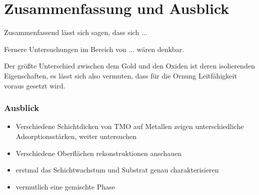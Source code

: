 \chapter{Zusammenfassung und Ausblick}
    Zusammenfassend lässt sich sagen, dass sich  ...

    Fernere Untersuchungen im Bereich von ... wären denkbar.

    Der größte Unterschied zwischen dem Gold und den Oxiden ist deren isolierenden Eigenschaften, es lässt sich also vermuten, dass für die Ornung Leitfähigkeit voraus gesetzt wird.


    \subsection{Ausblick}
    \begin{itemize}
        \item Verschiedene Schichtdicken von TMO auf Metallen zeigen unterschiedliche Adsorptionsstärken, weiter untersuchen \cite{IF_8}
        \item Verschiedene Oberflächen rekonstruktionen anschauen
        \item erstmal das Schichtwachstum und Substrat genau charakterisieren
        \item {} vermutlich eine gemischte Phase
    \end{itemize}